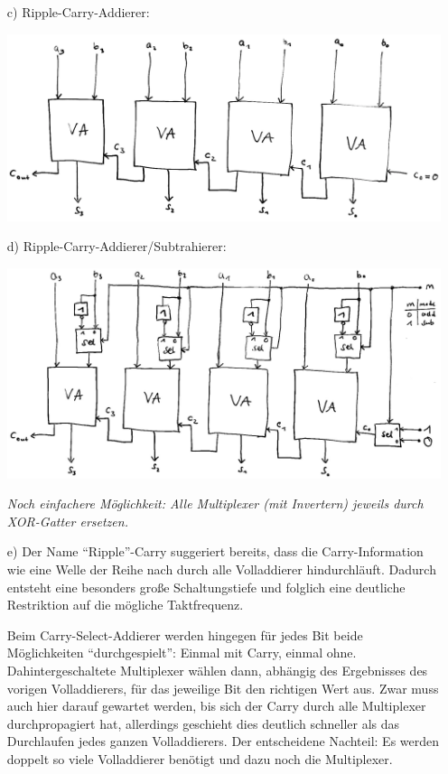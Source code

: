 \documentclass{article}
\begin{document}
	\begin{enumerate}
		\item[c)]Ripple-Carry-Addierer:
		\begin{center}
			\includegraphics[width=0.8\linewidth]{ripplecarry.png} 
		\end{center}
		\item[d)]Ripple-Carry-Addierer/Subtrahierer:
		\begin{center}
			\includegraphics[width=0.9\linewidth]{carry_add_sub.jpeg}
		\end{center}
		\textit{Noch einfachere Möglichkeit: Alle Multiplexer (mit Invertern) jeweils durch XOR-Gatter ersetzen.}
		\item[e)] Der Name "`Ripple"'-Carry suggeriert bereits, dass die Carry-Information wie eine Welle der Reihe nach durch alle Volladdierer hindurchläuft. Dadurch entsteht eine besonders große Schaltungstiefe und folglich eine deutliche Restriktion auf die mögliche Taktfrequenz. 
		
		Beim Carry-Select-Addierer werden hingegen für jedes Bit beide Möglichkeiten "`durchgespielt"': Einmal mit Carry, einmal ohne. Dahintergeschaltete Multiplexer wählen dann, abhängig des Ergebnisses des vorigen Volladdierers, für das jeweilige Bit den richtigen Wert aus. Zwar muss auch hier darauf gewartet werden, bis sich der Carry durch alle Multiplexer durchpropagiert hat, allerdings geschieht dies deutlich schneller als das Durchlaufen jedes ganzen Volladdierers. Der entscheidene Nachteil: Es werden doppelt so viele Volladdierer benötigt und dazu noch die Multiplexer. 
	\end{enumerate}
\end{document}
